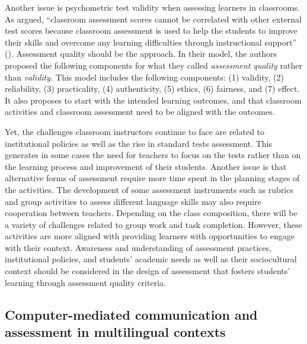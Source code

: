 \documentclass[output=paper]{langscibook}
\begin{document}
Another issue is psychometric test validity when assessing learners in classrooms. As \citet{PhakitiIsaacs2021} argued, “classroom assessment scores cannot be correlated with other external test scores because classroom assessment is used to help the students to improve their skills and overcome any learning difficulties through instructional support” (\citeyear[9]{PhakitiIsaacs2021}). Assessment quality should be the approach. In their model, the authors proposed the following components for what they called \textit{assessment quality} rather than \textit{validity.} This model includes the following components: (1) validity, (2) reliability, (3) practicality, (4) authenticity, (5) ethics, (6) fairness, and (7) effect. It also proposes to start with the intended learning outcomes, and that classroom activities and classroom assessment need to be aligned with the outcomes.

Yet, the challenges classroom instructors continue to face are related to institutional policies as well as the rise in standard tests assessment. This generates in some cases the need for teachers to focus on the tests rather than on the learning process and improvement of their students. Another issue is that alternative forms of assessment require more time spent in the planning stages of the activities. The development of some assessment instruments such as rubrics and group activities to assess different language skills may also require cooperation between teachers. Depending on the class composition, there will be a variety of challenges related to group work and task completion. However, these activities are more aligned with providing learners with opportunities to engage with their context. Awareness and understanding of assessment practices, institutional policies, and students’ academic needs as well as their sociocultural context should be considered in the design of assessment that fosters students' learning through assessment quality criteria.

\subsection{Computer-mediated communication and assessment in multilingual contexts}
\end{document}
